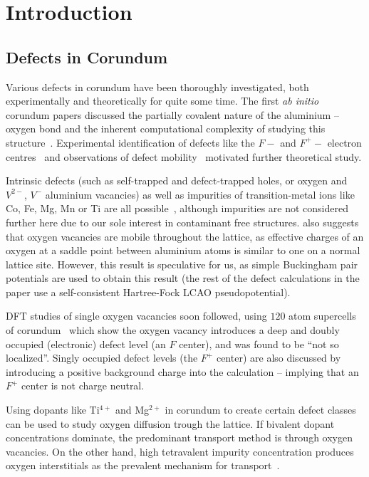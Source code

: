 \chapter{Introduction}

\section{Defects in Corundum}
Various defects in corundum have been thoroughly investigated, both experimentally and theoretically for quite some time.
The first \emph{ab initio} corundum papers discussed the partially covalent nature of the aluminium -- oxygen bond and the inherent computational complexity of studying this structure~\cite{Causa1987}.
Experimental identification of defects like the $F-$ and $F^+-$ electron centres~\cite{Kotomin1989} and observations of defect mobility~\cite{Kulis1991} motivated further theoretical study.

Intrinsic defects (such as self-trapped and defect-trapped holes, or oxygen and $V^{2-}$, $V^-$ aluminium vacancies) as well as impurities of transition-metal ions like Co, Fe, Mg, Mn or Ti are all possible~\cite{Jacobs1994}, although impurities are not considered further here due to our sole interest in contaminant free structures.
\citeauthor{Jacobs1994} also suggests that oxygen vacancies are mobile throughout the lattice, as effective charges of an oxygen at a saddle point between aluminium atoms is similar to one on a normal lattice site.
However, this result is speculative for us, as simple Buckingham pair potentials are used to obtain this result (the rest of the defect calculations in the paper use a self-consistent Hartree-Fock LCAO pseudopotential).

DFT studies of single oxygen vacancies soon followed, using $120$ atom supercells of corundum~\cite{Xu1997} which show the oxygen vacancy introduces a deep and doubly occupied (electronic) defect level (an $F$ center), and was found to be ``not so localized''.
Singly occupied defect levels (the $F^+$ center) are also discussed by introducing a positive background charge into the calculation -- implying that an $F^+$ center is not charge neutral.

Using dopants like Ti$^{4+}$ and Mg$^{2+}$ in corundum to create certain defect classes can be used to study oxygen diffusion trough the lattice.
If bivalent dopant concentrations dominate, the predominant transport method is through oxygen vacancies.
On the other hand, high tetravalent impurity concentration produces  oxygen interstitials as the prevalent mechanism for transport~\cite{Heuer1999}.

